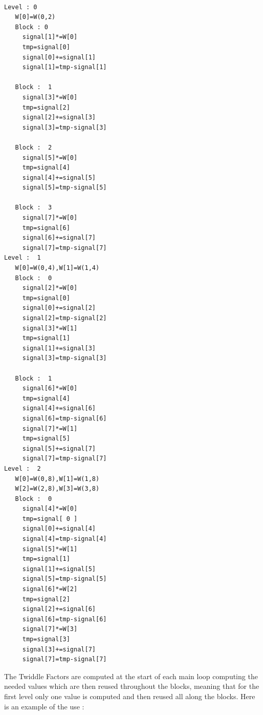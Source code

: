 \documentclass[a4paper]{report}
\begin{document}
\begin{lstlisting}[basicstyle=\tiny,caption=Computation done during the FFT computation of a signal of size $8$. Each column represents the overall loop 9$log(N)$ iterations. $W$ is the Twiddle Factor and each block is the inner loop performing the butterfly scheme.]

Level : 0
   W[0]=W(0,2)
   Block : 0
     signal[1]*=W[0]
     tmp=signal[0]
     signal[0]+=signal[1]
     signal[1]=tmp-signal[1]

   Block :  1
     signal[3]*=W[0]
     tmp=signal[2]
     signal[2]+=signal[3]
     signal[3]=tmp-signal[3]

   Block :  2
     signal[5]*=W[0]
     tmp=signal[4]
     signal[4]+=signal[5]
     signal[5]=tmp-signal[5]

   Block :  3
     signal[7]*=W[0]
     tmp=signal[6]
     signal[6]+=signal[7]
     signal[7]=tmp-signal[7]
Level :  1
   W[0]=W(0,4),W[1]=W(1,4)
   Block :  0
     signal[2]*=W[0]
     tmp=signal[0]
     signal[0]+=signal[2]
     signal[2]=tmp-signal[2]
     signal[3]*=W[1]
     tmp=signal[1]
     signal[1]+=signal[3]
     signal[3]=tmp-signal[3]

   Block :  1
     signal[6]*=W[0]
     tmp=signal[4]
     signal[4]+=signal[6]
     signal[6]=tmp-signal[6]
     signal[7]*=W[1]
     tmp=signal[5]
     signal[5]+=signal[7]
     signal[7]=tmp-signal[7]
Level :  2
   W[0]=W(0,8),W[1]=W(1,8)
   W[2]=W(2,8),W[3]=W(3,8)
   Block :  0
     signal[4]*=W[0]
     tmp=signal[ 0 ]
     signal[0]+=signal[4]
     signal[4]=tmp-signal[4]
     signal[5]*=W[1]
     tmp=signal[1]
     signal[1]+=signal[5]
     signal[5]=tmp-signal[5]
     signal[6]*=W[2]
     tmp=signal[2]
     signal[2]+=signal[6]
     signal[6]=tmp-signal[6]
     signal[7]*=W[3]
     tmp=signal[3]
     signal[3]+=signal[7]
     signal[7]=tmp-signal[7]
\end{lstlisting}

The Twiddle Factors are computed at the start of each main loop computing the needed values which are then reused throughout the blocks, meaning that for the first level only one value is computed and then reused all along the blocks.
Here is an example of the use :
\end{document}
